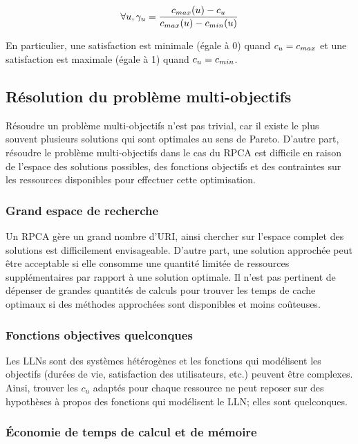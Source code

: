 \begin{equation}
  \forall u, \gamma_u = \dfrac{c_{max}(u) - c_u}{c_{max}(u) - c_{min}(u)}
  \label{cache:eq:user_satisfaction}
\end{equation}

En particulier, une satisfaction est minimale (égale à 0) quand $c_u = c_{max}$ et une satisfaction est maximale (égale à 1) quand $c_u = c_{min}$.

\subsection{Résolution du problème multi-objectifs}

Résoudre un problème multi-objectifs n'est pas trivial, car il existe le plus souvent plusieurs solutions qui sont optimales au sens de Pareto.
D'autre part, résoudre le problème multi-objectifs dans le cas du \ac{RPCA} est difficile en raison de l'espace des solutions possibles, des fonctions objectifs et des contraintes sur les ressources disponibles pour effectuer cette optimisation.

\subsubsection{Grand espace de recherche}

Un \ac{RPCA} gère un grand nombre d'\ac{URI}, ainsi chercher sur l'espace complet des solutions est difficilement envisageable.
D'autre part, une solution approchée peut être acceptable si elle consomme une quantité limitée de ressources supplémentaires par rapport à une solution optimale.
Il n'est pas pertinent de dépenser de grandes quantités de calculs pour trouver les temps de cache optimaux si des méthodes approchées sont disponibles et moins coûteuses.

\subsubsection{Fonctions objectives quelconques}

Les \ac{LLN}s sont des systèmes hétérogènes et les fonctions qui modélisent les objectifs (durées de vie, satisfaction des utilisateurs, etc.) peuvent être complexes.
Ainsi, trouver les $c_u$ adaptés pour chaque ressource ne peut reposer sur des hypothèses à propos des fonctions qui modélisent le \ac{LLN}; elles sont quelconques.

\subsubsection{Économie de temps de calcul et de mémoire}

